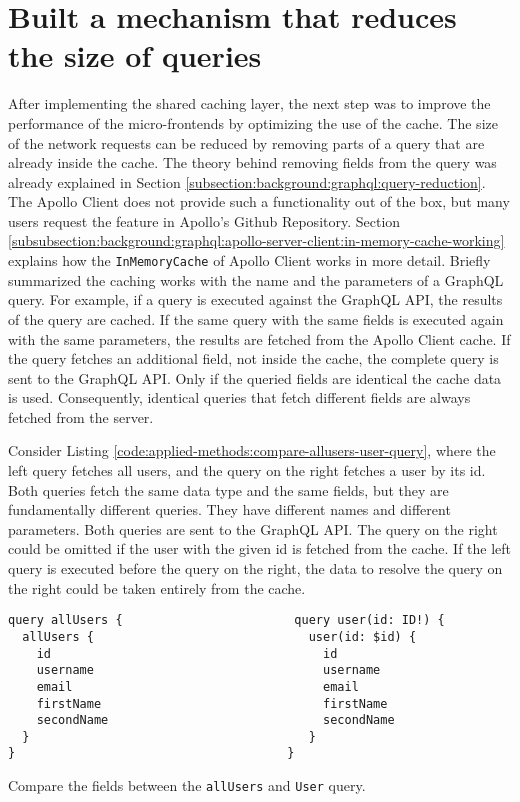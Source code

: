 \section{Built a mechanism that reduces the size of queries}\label{section:applied-methods:query-reduction}

After implementing the shared caching layer, the next step was to improve the performance of the micro-frontends by optimizing the use of the cache. The size of the network requests can be reduced by removing parts of a query that are already inside the cache. The theory behind removing fields from the query was already explained in Section \ref{subsection:background:graphql:query-reduction}. The Apollo Client does not provide such a functionality out of the box, but many users request the feature in Apollo's Github Repository. Section \ref{subsubsection:background:graphql:apollo-server-client:in-memory-cache-working} explains how the \texttt{InMemoryCache} of Apollo Client works in more detail. Briefly summarized the caching works with the name and the parameters of a GraphQL query. For example, if a query is executed against the GraphQL \ac{API}, the results of the query are cached. If the same query with the same fields is executed again with the same parameters, the results are fetched from the Apollo Client cache. If the query fetches an additional field, not inside the cache, the complete query is sent to the GraphQL \ac{API}. Only if the queried fields are identical the cache data is used. Consequently, identical queries that fetch different fields are always fetched from the server.

\bigskip

\noindent Consider Listing \ref{code:applied-methods:compare-allusers-user-query}, where the left query fetches all users, and the query on the right fetches a user by its id. Both queries fetch the same data type and the same fields, but they are fundamentally different queries. They have different names and different parameters. Both queries are sent to the GraphQL \ac{API}. The query on the right could be omitted if the user with the given id is fetched from the cache. If the left query is executed before the query on the right, the data to resolve the query on the right could be taken entirely from the cache.

\ifshowListings
\begin{listing}[H]
\begin{verbatim}
query allUsers {                        query user(id: ID!) {
  allUsers {                              user(id: $id) {
    id                                      id
    username                                username
    email                                   email
    firstName                               firstName
    secondName                              secondName
  }                                       }
}                                      }
\end{verbatim}
\caption{Compare the fields between the \texttt{allUsers} and \texttt{User} query.}\label{code:applied-methods:compare-allusers-user-query}
\end{listing}
\fi

